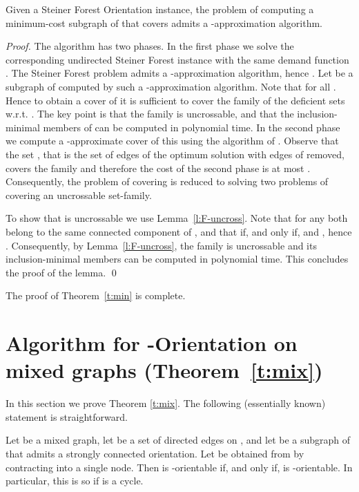 \documentclass[envcountsame]{llncs}
\begin{document}
\begin{lemma} \label{l:3}
Given a {\sf Steiner Forest Orientation} instance, the problem of compu\-ting a 
minimum-cost subgraph  of  that covers  admits a -approximation algorithm.
\end{lemma}
\begin{proof}
The algorithm has two phases.
In the first phase we solve the corresponding undirected {\sf Steiner Forest} instance
with the same demand function . The {\sf Steiner Forest} 
problem admits a -approximation algorithm, hence .
Let  be a subgraph of  computed by such a -approximation algorithm.
Note that  for all .
Hence to obtain a cover of  it is sufficient to cover 
the family  of the deficient sets w.r.t. .
The key point is that the family  is uncrossable, and that the inclusion-minimal 
members of  can be computed in polynomial time.
In the second phase we compute a -approximate cover of this  using the 
algorithm of \cite{GGPS}.
Observe that the set , that is 
the set of edges of the optimum solution with edges of  removed,
covers the family  and therefore the cost of the second phase 
is at most .
Consequently, the problem of covering  is reduced to solving two problems
of covering an uncrossable set-family.  

To show that  is uncrossable we use Lemma~\ref{l:F-uncross}.
Note that for any  both  belong to the same connected component of , 
and that  if, and only if,  and ,
hence .
Consequently, by Lemma~\ref{l:F-uncross}, the family  is uncrossable and its 
inclusion-minimal members can be computed in polynomial time.
This concludes the proof of the lemma.
\qed
\end{proof}

The proof of Theorem~\ref{t:min} is complete.

\section{Algorithm for {\sf -Orientation} on mixed graphs (Theorem~\ref{t:mix})} \label{s:mix}

In this section we prove Theorem \ref{t:mix}.
The following (essentially known) statement is straightforward. 

\begin{lemma} \label{lem:contract-cycle}
Let  be a mixed graph, let  be a set of directed edges on , 
and let  be a subgraph of  that admits a strongly connected orientation. 
Let  be obtained from  by contracting  into a single node.
Then  is -orientable if, and only if,  is -orientable. 
In particular, this is so if  is a cycle. \hfill 
\end{lemma}
\end{document}
